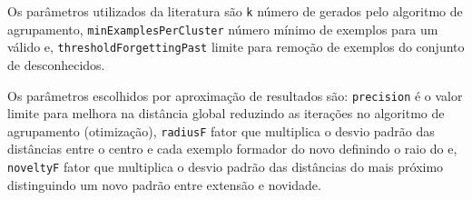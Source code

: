 Os parâmetros utilizados da literatura são
\texttt{k} número de \mclusters gerados pelo algoritmo de agrupamento,
\texttt{minExamplesPerCluster} número mínimo de exemplos para um \mcluster válido
e,
\texttt{thresholdForgettingPast} limite para remoção de exemplos do conjunto de
desconhecidos.

Os parâmetros escolhidos por aproximação de resultados são:
\texttt{precision} é o valor limite para melhora na distância global reduzindo as 
iterações no algoritmo de agrupamento (otimização),
\texttt{radiusF} fator que multiplica o desvio padrão das distâncias entre o
centro e cada exemplo formador do novo \mcluster definindo o raio do \mcluster
e,
\texttt{noveltyF} fator que multiplica o desvio padrão das distâncias do
\mcluster mais próximo distinguindo um novo padrão entre extensão e novidade.


